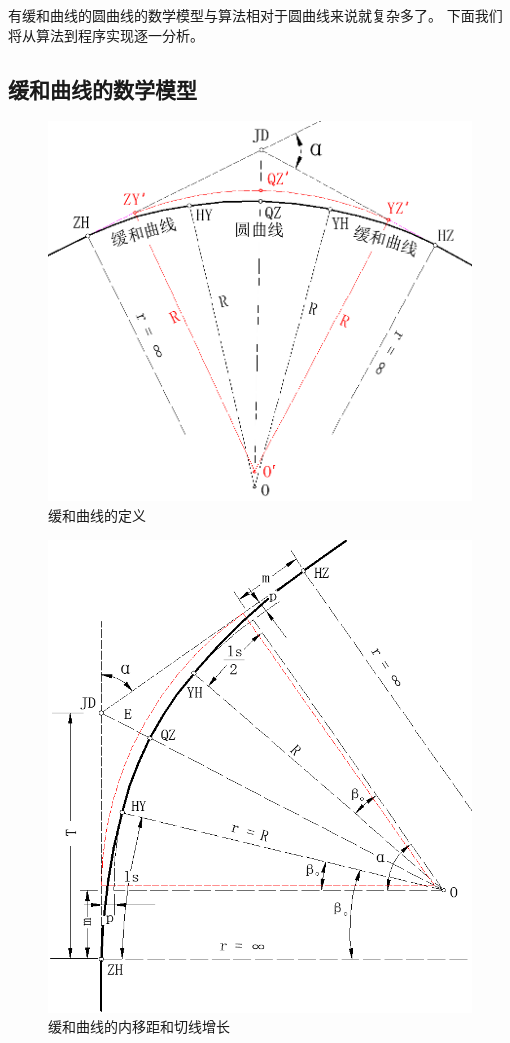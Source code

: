 有缓和曲线的圆曲线的数学模型与算法相对于圆曲线来说就复杂多了。
下面我们将从算法到程序实现逐一分析。

\subsection{缓和曲线的数学模型}

 \begin{figure}[htbp]
    \centering
    \includegraphics[scale=0.6]{route/HY01.png}
    \caption{缓和曲线的定义}
    \label{fig:HR01}
\end{figure}


\begin{figure}[htbp]
    \centering
    \includegraphics[scale=0.6]{route/HY02.png}
    \caption{缓和曲线的内移距和切线增长}
    \label{fig:HY02}
\end{figure}



